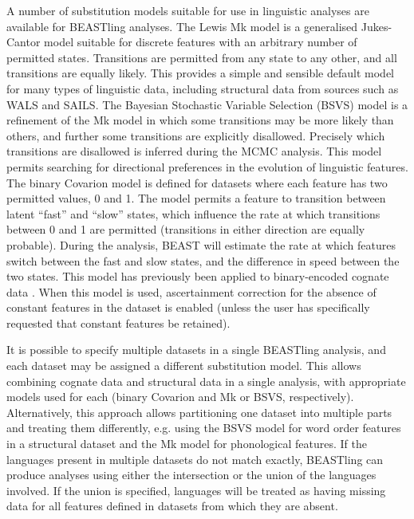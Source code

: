 \documentclass[twocolumn,10pt]{scrartcl}
\begin{document}
A number of substitution models suitable for use in linguistic analyses are available for BEASTling analyses.  The Lewis Mk model\cite{Lewis2001} is a generalised Jukes-Cantor model suitable for discrete features with an arbitrary number of permitted states.  Transitions are permitted from any state to any other, and all transitions are equally likely.  This provides a simple and sensible default model for many types of linguistic data, including structural data from sources such as WALS\cite{Dryer2013} and SAILS\cite{Muysken2014}.  The Bayesian Stochastic Variable Selection (BSVS) model is a refinement of the Mk model in which some transitions may be more likely than others, and further some transitions are explicitly disallowed.  Precisely which transitions are disallowed is inferred during the MCMC analysis.  This model permits searching for directional preferences in the evolution of linguistic features.  The binary Covarion model\cite{Penny2001} is defined for datasets where each feature has two permitted values, 0 and 1.  The model permits a feature to transition between latent ``fast'' and ``slow'' states, which influence the rate at which transitions between 0 and 1 are permitted (transitions in either direction are equally probable).  During the analysis, BEAST will estimate the rate at which features switch between the fast and slow states, and the difference in speed between the two states.  This model has previously been applied to binary-encoded cognate data \cite{Gray2009,Bouckaert2012}.  When this model is used, ascertainment correction for the absence of constant features in the dataset is enabled (unless the user has specifically requested that constant features be retained).

It is possible to specify multiple datasets in a single BEASTling analysis, and each dataset may be assigned a different substitution model.  This allows combining cognate data and structural data in a single analysis, with appropriate models used for each (binary Covarion and Mk or BSVS, respectively).  Alternatively, this approach allows partitioning one dataset into multiple parts and treating them differently, e.g. using the BSVS model for word order features in a structural dataset and the Mk model for phonological features.  If the languages present in multiple datasets do not match exactly, BEASTling can produce analyses using either the intersection or the union of the languages involved.  If the union is specified, languages will be treated as having missing data for all features defined in datasets from which they are absent.
\end{document}

